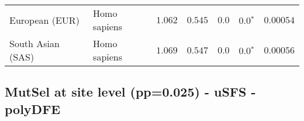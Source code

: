 \begin{center}
\begin{adjustbox}{width = 1\textwidth}
\begin{tabular}{|l|l|r|r|r|r|r|}
                 European (EUR) &         Homo sapiens &                                           $ 1.062$ &                                           $ 0.545$ &            $0.0$ &                  $\bm{0.0{^*}}$ &          $0.00054$ \\
              South Asian (SAS) &         Homo sapiens &                                           $ 1.069$ &                                           $ 0.547$ &            $0.0$ &                  $\bm{0.0{^*}}$ &          $0.00056$ \\
\bottomrule
\end{tabular}
\end{adjustbox}
\newpage
\end{center}
\subsection{MutSel at site level (pp=0.025) - uSFS - polyDFE} 
